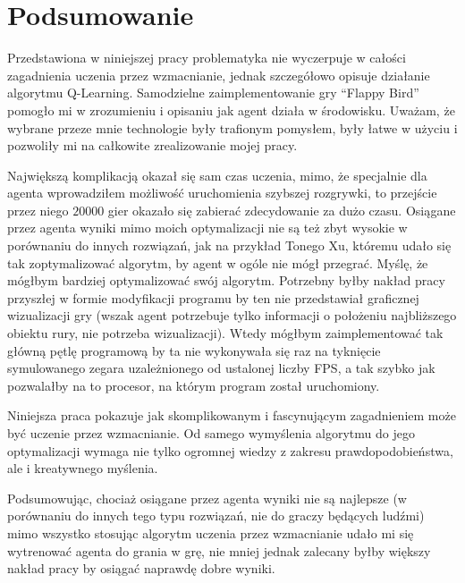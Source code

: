 \documentclass[a4paper, 12pt,oneside]{book}
\newcommand\chap[1]{%
  \chapter*{#1}%
  \addcontentsline{toc}{chapter}{#1}}
\begin{document}
\chap{Podsumowanie}
Przedstawiona w niniejszej pracy problematyka nie wyczerpuje w całości
zagadnienia uczenia przez wzmacnianie, jednak szczegółowo opisuje działanie
algorytmu Q-Learning. Samodzielne zaimplementowanie gry ``Flappy Bird'' pomogło
mi w zrozumieniu i opisaniu jak agent działa w środowisku. Uważam, że wybrane
przeze mnie technologie były trafionym pomysłem, były łatwe w użyciu i
pozwoliły mi na całkowite zrealizowanie mojej pracy.

Największą komplikacją okazał się sam czas uczenia, mimo, że specjalnie dla 
agenta wprowadziłem możliwość uruchomienia szybszej rozgrywki, to przejście
przez niego $20000$ gier okazało się zabierać zdecydowanie za dużo czasu.
Osiągane przez agenta wyniki mimo moich optymalizacji nie są też zbyt wysokie w
porównaniu do innych rozwiązań, jak na przykład Tonego Xu, któremu udało się
tak zoptymalizować algorytm, by agent w ogóle nie mógł
przegrać\cite{tds_rl_score}. Myślę, że mógłbym bardziej optymalizować swój
algorytm. Potrzebny byłby nakład pracy przyszłej w formie modyfikacji programu
by ten nie przedstawiał graficznej wizualizacji gry (wszak agent potrzebuje
tylko informacji o położeniu najbliższego obiektu rury, nie potrzeba
wizualizacji). Wtedy mógłbym zaimplementować tak główną pętlę programową by ta
nie wykonywała się raz na tyknięcie symulowanego zegara uzależnionego od
ustalonej liczby FPS, a tak szybko jak pozwalałby na to procesor, na którym
program został uruchomiony.
	
Niniejsza praca pokazuje jak skomplikowanym i fascynującym zagadnieniem może
być uczenie przez wzmacnianie. Od samego wymyślenia algorytmu do jego
optymalizacji wymaga nie tylko ogromnej wiedzy z zakresu prawdopodobieństwa,
ale i kreatywnego myślenia.

Podsumowując, chociaż osiągane przez agenta wyniki nie są najlepsze (w
porównaniu do innych tego typu rozwiązań, nie do graczy będących ludźmi)
mimo wszystko stosując algorytm uczenia przez wzmacnianie udało mi się
wytrenować agenta do grania w grę, nie mniej jednak zalecany byłby większy
nakład pracy by osiągać naprawdę dobre wyniki.


%
%

%


\end{document}
